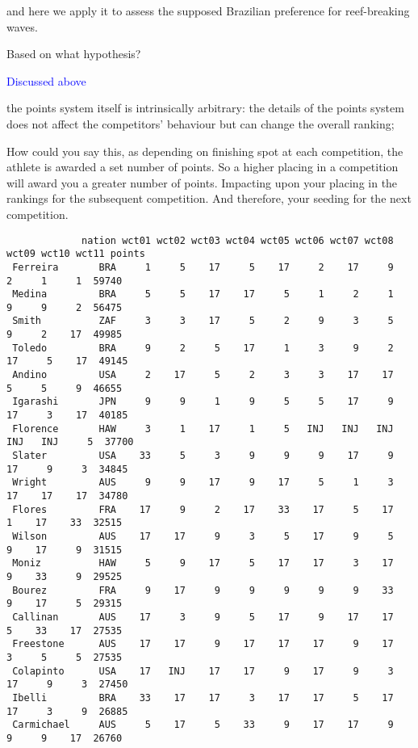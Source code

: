 \documentclass[12pt]{article}
\begin{document}
and here we apply it to assess the supposed Brazilian preference for
reef-breaking waves.

Based on what hypothesis?

\textcolor{blue}{Discussed above}

the points system itself is intrinsically arbitrary: the details of
the points system does not affect the competitors' behaviour but can
change the overall ranking;

How could you say this, as depending on finishing spot at each
competition, the athlete is awarded a set number of points. So a
higher placing in a competition will award you a greater number of
points. Impacting upon your placing in the rankings for the subsequent
competition. And therefore, your seeding for the next competition.

{\footnotesize
\begin{verbatim}
             nation wct01 wct02 wct03 wct04 wct05 wct06 wct07 wct08 wct09 wct10 wct11 points
 Ferreira       BRA     1     5    17     5    17     2    17     9     2     1     1  59740
 Medina         BRA     5     5    17    17     5     1     2     1     9     9     2  56475
 Smith          ZAF     3     3    17     5     2     9     3     5     9     2    17  49985
 Toledo         BRA     9     2     5    17     1     3     9     2    17     5    17  49145
 Andino         USA     2    17     5     2     3     3    17    17     5     5     9  46655
 Igarashi       JPN     9     9     1     9     5     5    17     9    17     3    17  40185
 Florence       HAW     3     1    17     1     5   INJ   INJ   INJ   INJ   INJ     5  37700
 Slater         USA    33     5     3     9     9     9    17     9    17     9     3  34845
 Wright         AUS     9     9    17     9    17     5     1     3    17    17    17  34780
 Flores         FRA    17     9     2    17    33    17     5    17     1    17    33  32515
 Wilson         AUS    17    17     9     3     5    17     9     5     9    17     9  31515
 Moniz          HAW     5     9    17     5    17    17     3    17     9    33     9  29525
 Bourez         FRA     9    17     9     9     9     9     9    33     9    17     5  29315
 Callinan       AUS    17     3     9     5    17     9    17    17     5    33    17  27535
 Freestone      AUS    17    17     9    17    17    17     9    17     3     5     5  27535
 Colapinto      USA    17   INJ    17    17     9    17     9     3    17     9     3  27450
 Ibelli         BRA    33    17    17     3    17    17     5    17    17     3     9  26885
 Carmichael     AUS     5    17     5    33     9    17    17     9     9     9    17  26760

\end{verbatim}}
\end{document}
